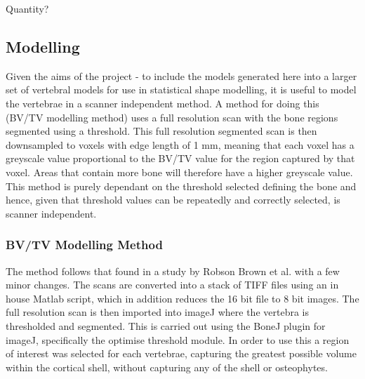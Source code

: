Quantity?


\subsection{Modelling}

Given the aims of the project - to include the models generated here into a larger set of vertebral models for use in statistical shape modelling, it is useful to model the vertebrae in a scanner independent method.
A method for doing this (BV/TV modelling method) uses a full resolution scan with the bone regions segmented using a threshold.
This full resolution segmented scan is then downsampled to voxels with edge length of 1 mm, meaning that each voxel has a greyscale value proportional to the BV/TV value for the region captured by that voxel.
Areas that contain more bone will therefore have a higher greyscale value.
This method is purely dependant on the threshold selected defining the bone and hence, given that threshold values can be repeatedly and correctly selected, is scanner independent.

\subsubsection{BV/TV Modelling Method}

The method follows that found in a study by Robson Brown et al. \cite{RobsonBrown2014} with a few minor changes.
The scans are converted into a stack of TIFF files using an in house Matlab script, which in addition reduces the 16 bit file to 8 bit images.
The full resolution scan is then imported into imageJ where the vertebra is thresholded and segmented.
This is carried out using the BoneJ plugin for imageJ, specifically the optimise threshold module.
In order to use this a region of interest was selected for each vertebrae, capturing the greatest possible volume within the cortical shell, without capturing any of the shell or osteophytes.





